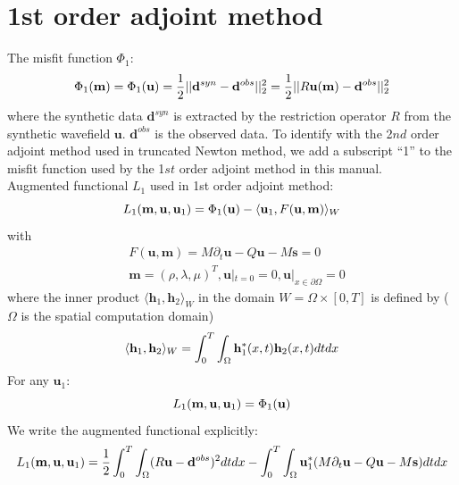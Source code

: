 \documentclass[pdftex,a4paper,parskip,listof=totoc,bibliography=totoc,onehalfspacing,12pt]{scrreprt}
\begin{document}
\section{1st order adjoint method}
The misfit function $\Phi_1$:
\begin{equation}
 \Phi_1(\mathbf{m}) = \Phi_1(\mathbf{u}) = \frac{1}{2} || \mathbf{d}^{syn} - \mathbf{d}^{obs} ||_2^2 = \frac{1}{2} || R\mathbf{u}(\mathbf{m}) - \mathbf{d}^{obs} ||_2^2 \\
\end{equation}
where the synthetic data $\mathbf{d}^{syn}$ is extracted by the restriction operator $R$ from the synthetic wavefield $\mathbf{u}$. $\mathbf{d}^{obs}$ is the observed data. To identify with the 2$nd$ order adjoint method used in truncated Newton method, we add a subscript ``1'' to the misfit function used by the 1$st$ order adjoint method in this manual.\\
Augmented functional $L_1$ used in 1st order adjoint method:
\begin{equation}
 L_1(\mathbf{m}, \mathbf{u},\mathbf{u}_{1}) = \Phi_1(\mathbf{u}) - \langle \mathbf{u}_{1}, F(\mathbf{u},\mathbf{m}) \rangle_W \\
\end{equation}
with
\begin{equation}
\begin{split}
\label{eqn:initialCondition11}
 & F(\mathbf{u},\mathbf{m}) = M \partial_{t} \mathbf{u}  - Q\mathbf{u} - M \mathbf{s} = 0 \\
 & \mathbf{m} = (\rho, \lambda, \mu)^T, \mathbf{u}|_{t=0} = 0, \mathbf{u}|_{x\in \partial \Omega} = 0
 \end{split}
\end{equation}
where the inner product $\langle \mathbf{h}_1, \mathbf{h}_2 \rangle_W$ in the domain $W=\Omega \times [0, T]$ is defined by ($\Omega$ is the spatial computation domain)\\
\begin{equation}
 \langle \mathbf{h}_1, \mathbf{h}_2 \rangle_W = \int_0^T \int_\Omega \mathbf{h}_1^{*}(x,t) \mathbf{h}_2(x,t) dt dx\\
\end{equation}
For any $\mathbf{u}_{1}$:
\begin{equation}
 L_1(\mathbf{m}, \mathbf{u},\mathbf{u}_{1}) = \Phi_1(\mathbf{u}) \\
\end{equation}
We write the augmented functional explicitly:
\begin{equation}
\label{eqn:AugmentFunctional}
 L_1(\mathbf{m}, \mathbf{u},\mathbf{u}_{1}) = \frac{1}{2} \int_0^T \int_\Omega (R\mathbf{u} - \mathbf{d}^{obs})^2 dt dx - \int_0^T \int_\Omega \mathbf{u}_{1}^{*} (M \partial_{t} \mathbf{u} - Q \mathbf{u} - M \mathbf{s})  dt dx\\
\end{equation}
\end{document}
